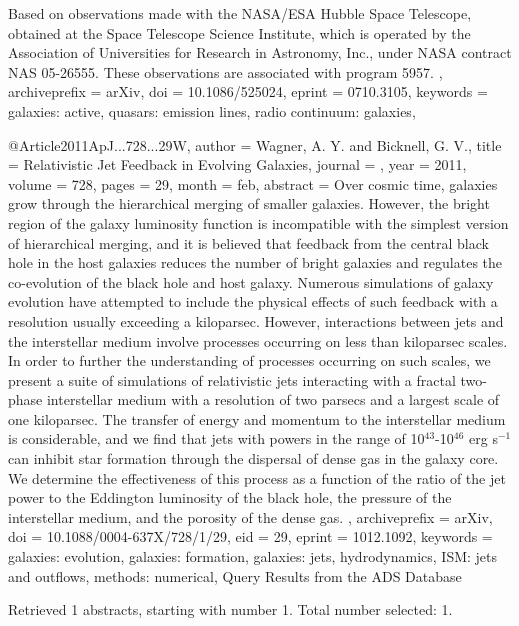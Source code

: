 \documentclass[longauth]{aa}
\begin{document}
{{{{{{{{{{{Based on observations made with the NASA/ESA Hubble Space Telescope,
obtained at the Space Telescope Science Institute, which is operated by
the Association of Universities for Research in Astronomy, Inc., under
NASA contract NAS 05-26555. These observations are associated with
program 5957.
},
  archiveprefix = {arXiv},
  doi           = {10.1086/525024},
  eprint        = {0710.3105},
  keywords      = {galaxies: active, quasars: emission lines, radio continuum: galaxies},
}

@Article{2011ApJ...728...29W,
  author        = {Wagner, A. Y. and Bicknell, G. V.},
  title         = {Relativistic Jet Feedback in Evolving Galaxies},
  journal       = {\apj},
  year          = {2011},
  volume        = {728},
  pages         = {29},
  month         = feb,
  abstract      = {Over cosmic time, galaxies grow through the hierarchical merging of
smaller galaxies. However, the bright region of the galaxy luminosity
function is incompatible with the simplest version of hierarchical
merging, and it is believed that feedback from the central black hole in
the host galaxies reduces the number of bright galaxies and regulates
the co-evolution of the black hole and host galaxy. Numerous simulations
of galaxy evolution have attempted to include the physical effects of
such feedback with a resolution usually exceeding a kiloparsec. However,
interactions between jets and the interstellar medium involve processes
occurring on less than kiloparsec scales. In order to further the
understanding of processes occurring on such scales, we present a suite
of simulations of relativistic jets interacting with a fractal two-phase
interstellar medium with a resolution of two parsecs and a largest scale
of one kiloparsec. The transfer of energy and momentum to the
interstellar medium is considerable, and we find that jets with powers
in the range of 10$^{43}$-10$^{46}$ erg s$^{-1}$ can
inhibit star formation through the dispersal of dense gas in the galaxy
core. We determine the effectiveness of this process as a function of
the ratio of the jet power to the Eddington luminosity of the black
hole, the pressure of the interstellar medium, and the porosity of the
dense gas.
},
  archiveprefix = {arXiv},
  doi           = {10.1088/0004-637X/728/1/29},
  eid           = {29},
  eprint        = {1012.1092},
  keywords      = {galaxies: evolution, galaxies: formation, galaxies: jets, hydrodynamics, ISM: jets and outflows, methods: numerical},
}
Query Results from the ADS Database


Retrieved 1 abstracts, starting with number 1.  Total number selected: 1.

}}}}}}}}}
\end{document}
